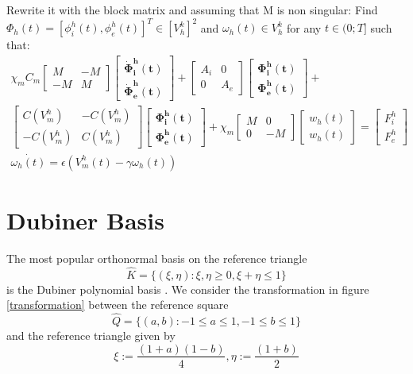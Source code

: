 \documentclass[a4paper,12pt]{article}
\begin{document}
 Rewrite it with the block matrix and assuming that M is non singular:
 \newline
 Find $\Phi_h(t)=[\phi_i^h(t),\phi_e^h(t)]^T \in [V_h^k]^2$ and $\omega_h(t) \in V_h^k$ for any $t \in (0;T]$ such that:
 \begin{equation}
 \begin{gathered}
 \chi_mC_m \begin{bmatrix}M &-M \\ -M & M \end{bmatrix}
	\begin{bmatrix}\bm{\dot{\Phi}_i^h(t)} \\ \bm{\dot{\Phi}_e^h(t)} \end{bmatrix}
	 + \begin{bmatrix}A_i & 0 \\ 0 & A_e \end{bmatrix}
	 \begin{bmatrix}\bm{\Phi_i^h(t)} \\ \bm{\Phi_e^h(t)} \end{bmatrix} +\\
	   \begin{bmatrix}C(V_m^h) & -C(V_m^h) \\ -C(V_m^h) & C(V_m^h) \end{bmatrix} 
	   \begin{bmatrix} \bm{\Phi_i^h(t)} \\ \bm{\Phi_e^h(t)}  \end{bmatrix} 
	   +\chi_m \begin{bmatrix}M & 0 \\ 0 & -M \end{bmatrix} 
	   	\begin{bmatrix}w_h(t) \\ w_h(t) \end{bmatrix} = 
	   	\begin{bmatrix} F_i^h \\ F_e^h\end{bmatrix}\\
	   \dot{\omega_h(t)}=\epsilon (V_m^h(t)-\gamma \omega_h(t))
\end{gathered}
\end{equation}
\section{Dubiner Basis}
    The most popular orthonormal basis on the reference triangle
    \begin{equation}
    \hat{K}=\{ (\xi, \eta) : \xi, \eta \ge 0,	\xi+\eta \le 1 \}
    \end{equation}
    is the Dubiner polynomial basis \cite{antonietti}. We consider the transformation in figure \ref{transformation} between the reference square
    \begin{equation}
    \hat{Q}=\{ (a, b) : -1 \le a \le 1, -1 \le b \le 1 \}
    \end{equation}
    and the reference triangle given by
    \begin{equation}
    \xi:=\frac{(1+a)(1-b)}{4},  \eta:=\frac{(1+b)}{2}
    \end{equation}
    
\end{document}
